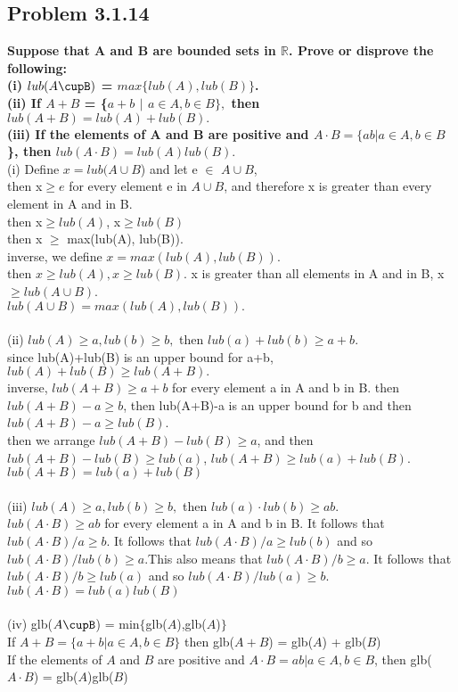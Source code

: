 \documentclass[12pt]{article}
\theoremstyle{definition}
\numberwithin{equation}{subsection}
\begin{document}
\subsection{Problem 3.1.14}
\textbf{Suppose that A and B are bounded sets in $\mathbb{R}$. Prove or disprove the following: \\ (i) $lub(A\cupB)$ = $max\{lub(A), lub(B)\}$.\\(ii) If $A+B$ = \{$a+b$ $|$ $a \in A, b \in B\},$ then $lub(A+B) = lub(A) + lub(B).$\\(iii) If the elements of A and B are positive and $A\cdot B = \{ab | a \in A, b\in B$\}, then $lub(A\cdot B) = lub(A) lub(B).$}
\\
(i) Define $x= lub(A\cup B$) and let e $\in$ $A\cup B$,
\\then x$\geq e$ for every element e in $A\cup B$, and therefore x is greater than every element in A and in B. 
\\then x$\geq lub(A)$, x$\geq lub(B)$
\\then x $\geq$ max(lub(A), lub(B)).
\\inverse, we define $x=max(lub(A), lub(B)).$
\\then $x\geq lub(A), x\geq lub(B) $. x is greater than all elements in A and in B, x $\geq lub(A\cup B)$.
\\$lub(A\cup B)=max(lub(A), lub(B)).$\\
\\(ii) $lub(A) \geq a, lub(b)\geq b,$ then $lub(a)+lub(b)\geq a+b.$ 
\\since lub(A)+lub(B) is an upper bound for a+b, $lub(A)+lub(B)\geq lub(A+B).$
\\inverse, $lub(A+B)\geq a+b$ for every element a in A and b in B. then $lub(A+B)-a \geq b$, then lub(A+B)-a is an upper bound for b and then $lub(A+B)-a \geq lub(B)$.
\\then we arrange $lub(A+B)-lub(B) \geq a$, and then $lub(A+B)-lub(B) \geq lub(a)$, $lub(A+B) \geq lub(a)+lub(B)$.
\\$lub(A+B)= lub(a)+lub(B)$
\\
\\(iii) $lub(A) \geq a, lub(b)\geq b,$ then $lub(a)\cdot lub(b)\geq ab$.
\\ $lub(A \cdot B) \geq ab$ for every element a in A and b in B. It follows that $lub(A \cdot B)/a \geq b$. It follows that $lub(A \cdot B)/a \geq lub(b)$ and so $lub(A \cdot B)/lub(b) \geq a$.This also means that $lub(A \cdot B)/b \geq a$. It follows that $lub(A \cdot B)/b \geq lub(a)$ and so $lub(A \cdot B)/lub(a) \geq b$. \\ $lub(A \cdot B)= lub(a)lub(B)$
\\
\\(iv) glb($A\cupB$) = min$\{$glb($A$),glb($A$)$\}$
\\ If $A+B = \{a + b| a \in A, b \in B\}$ then glb($A+B$) = glb($A$) + glb($B$)
\\ If the elements of $A$ and $B$ are positive and $A\cdot B = {ab | a \in A, b \in B}$, then glb($A \cdot B$) = glb($A$)glb($B$)
\end{document}
